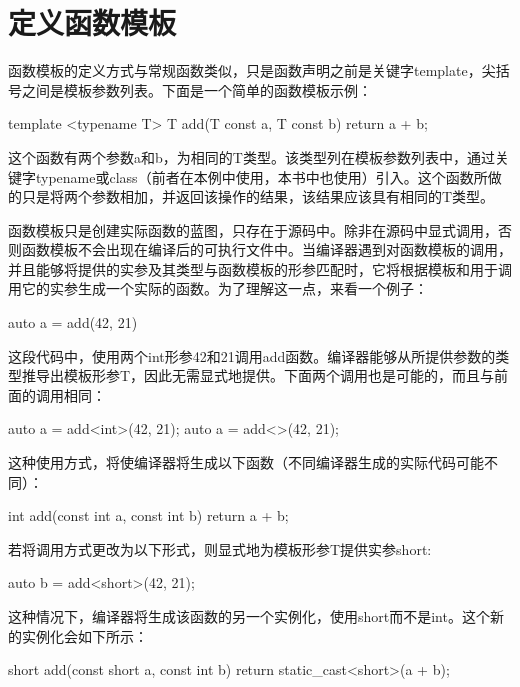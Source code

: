 \section{定义函数模板}
函数模板的定义方式与常规函数类似，只是函数声明之前是关键字template，尖括号之间是模板参数列表。下面是一个简单的函数模板示例：

\begin{cppcode}
template <typename T>
T add(T const a, T const b)
{
	return a + b;
}
\end{cppcode}

这个函数有两个参数a和b，为相同的T类型。该类型列在模板参数列表中，通过关键字typename或class（前者在本例中使用，本书中也使用）引入。这个函数所做的只是将两个参数相加，并返回该操作的结果，该结果应该具有相同的T类型。

函数模板只是创建实际函数的蓝图，只存在于源码中。除非在源码中显式调用，否则函数模板不会出现在编译后的可执行文件中。当编译器遇到对函数模板的调用，并且能够将提供的实参及其类型与函数模板的形参匹配时，它将根据模板和用于调用它的实参生成一个实际的函数。为了理解这一点，来看一个例子：

\begin{cppcode}
auto a = add(42, 21)
\end{cppcode}

这段代码中，使用两个int形参42和21调用add函数。编译器能够从所提供参数的类型推导出模板形参T，因此无需显式地提供。下面两个调用也是可能的，而且与前面的调用相同：

\begin{cppcode}
auto a = add<int>(42, 21);
auto a = add<>(42, 21);
\end{cppcode}

这种使用方式，将使编译器将生成以下函数（不同编译器生成的实际代码可能不同）：

\begin{cppcode}
int add(const int a, const int b)
{
	return a + b;
}
\end{cppcode}

若将调用方式更改为以下形式，则显式地为模板形参T提供实参short:

\begin{cppcode}
auto b = add<short>(42, 21);
\end{cppcode}

这种情况下，编译器将生成该函数的另一个实例化，使用short而不是int。这个新的实例化会如下所示：

\begin{cppcode}
short add(const short a, const int b)
{
	return static_cast<short>(a + b);
}
\end{cppcode}

